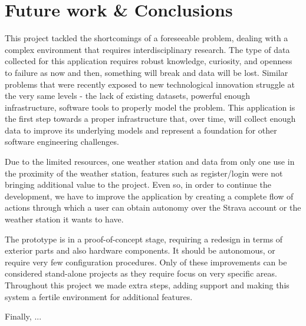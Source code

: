 \chapter{Future work \& Conclusions}
\pagestyle{fancy}
\label{futurework}

This project tackled the shortcomings of a foreseeable problem, dealing with a complex environment that requires interdisciplinary research. The type of data collected for this application requires robust knowledge, curiosity, and openness to failure as now and then, something will break and data will be lost. Similar problems that were recently exposed to new technological innovation struggle at the very same levels - the lack of existing datasets, powerful enough infrastructure, software tools to properly model the problem. This application is the first step towards a proper infrastructure that, over time, will collect enough data to improve its underlying models and represent a foundation for other software engineering challenges.


Due to the limited resources, one weather station and data from only one use in the proximity of the weather station, features such as register/login were not bringing additional value to the project. Even so, in order to continue the development, we have to improve the application by creating a complete flow of actions through which a user can obtain autonomy over the Strava account or the weather station it wants to have.

The prototype is in a proof-of-concept stage, requiring a redesign in terms of exterior parts and also hardware components. It should be autonomous, or require very few configuration procedures. Only of these improvements can be considered stand-alone projects as they require focus on very specific areas. Throughout this project we made extra steps, adding support and making this system a fertile environment for additional features. 

\clearpage
Finally, ...

\lhead{}